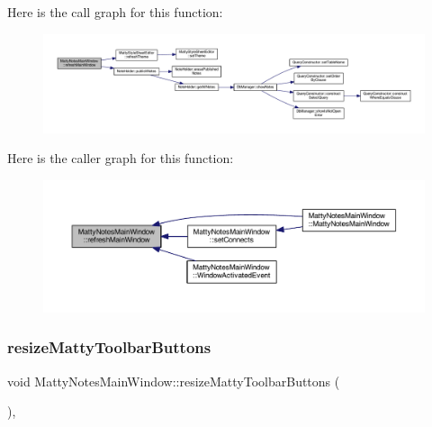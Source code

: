 Here is the call graph for this function\+:
\nopagebreak
\begin{figure}[H]
\begin{center}
\leavevmode
\includegraphics[width=350pt]{classMattyNotesMainWindow_a12025cd56092bb34c6451a92197b69a1_cgraph}
\end{center}
\end{figure}
Here is the caller graph for this function\+:
\nopagebreak
\begin{figure}[H]
\begin{center}
\leavevmode
\includegraphics[width=350pt]{classMattyNotesMainWindow_a12025cd56092bb34c6451a92197b69a1_icgraph}
\end{center}
\end{figure}
\hypertarget{classMattyNotesMainWindow_a7fd491b7b955e57d8f93143c7c5e784b}{}\label{classMattyNotesMainWindow_a7fd491b7b955e57d8f93143c7c5e784b} 
\subsubsection{\texorpdfstring{resize\+Matty\+Toolbar\+Buttons}{resizeMattyToolbarButtons}}
{\footnotesize\ttfamily void Matty\+Notes\+Main\+Window\+::resize\+Matty\+Toolbar\+Buttons (\begin{DoxyParamCaption}{ }\end{DoxyParamCaption})\hspace{0.3cm}{\ttfamily [private]}, {\ttfamily [slot]}}



